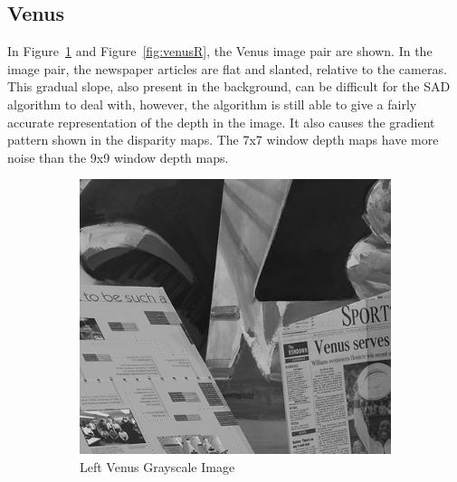\subsection{Venus}
\label{sec:venus}

In Figure~\ref{fig:venusL} and Figure~\ref{fig:venusR}, the Venus image pair are shown. In the image pair, the newspaper articles are flat and slanted, relative to the cameras. This gradual slope, also present in the background, can be difficult for the SAD algorithm to deal with, however, the algorithm is still able to give a fairly accurate representation of the depth in the image. It also causes the gradient pattern shown in the disparity maps. The 7x7 window depth maps have more noise than the 9x9 window depth maps.

\begin{figure}
\begin{center}
	\begin{subfigure}{0.45\textwidth}
		\includegraphics[width=\textwidth]{figures/venusL.png}
		\caption{Left Venus Grayscale Image}
		\label{fig:venusL}
	\end{subfigure}
	\begin{subfigure}{0.45\textwidth}

\end{subfigure}
\end{center}
\end{figure}
